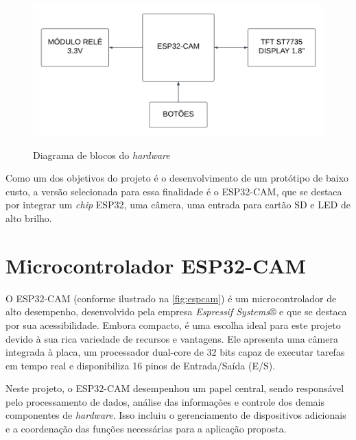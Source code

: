 \begin{figure}[h!]
    \centering
    \caption{Diagrama de blocos do \textit{hardware}}
    \includegraphics[scale=0.22]{figuras/diagrama_hardware.png}
    \fonte{}%
    \label{fig:fluxohard}
    \centering
\end{figure}

Como um dos objetivos do projeto é o desenvolvimento de um protótipo de
baixo custo, a versão selecionada para essa finalidade é o ESP32-CAM,
que se destaca por integrar um \textit{chip} ESP32, uma câmera, uma
entrada para cartão SD e LED de alto brilho.

\section{Microcontrolador ESP32-CAM}\label{sec:materiais}

O ESP32-CAM (conforme ilustrado na \autoref{fig:espcam}) é um
microcontrolador de alto desempenho, desenvolvido pela empresa
\textit{Espressif Systems}® e que se destaca por sua acessibilidade.
Embora compacto, é uma escolha ideal para este projeto devido à sua
rica variedade de recursos e vantagens. Ele apresenta uma câmera
integrada à placa, um processador dual-core de 32 bits capaz de
executar tarefas em tempo real e disponibiliza 16 pinos de
Entrada/Saída (E/S).

Neste projeto, o ESP32-CAM desempenhou um papel central, sendo
responsável pelo processamento de dados, análise das informações
e controle dos demais componentes de \textit{hardware}. Isso incluiu
o gerenciamento de dispositivos adicionais e a coordenação das funções
necessárias para a aplicação proposta.

